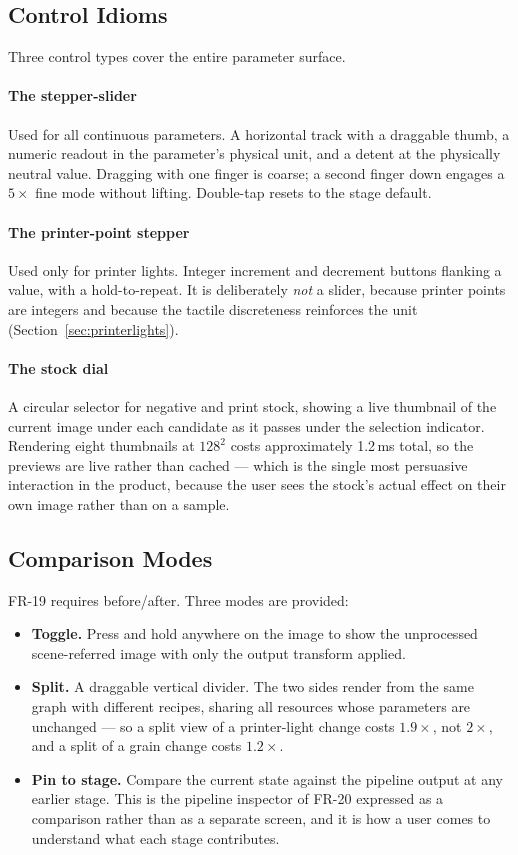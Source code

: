 \subsection{Control Idioms}

Three control types cover the entire parameter surface.

\paragraph{The stepper-slider} Used for all continuous parameters. A horizontal
track with a draggable thumb, a numeric readout in the parameter's physical unit,
and a detent at the physically neutral value. Dragging with one finger is coarse;
a second finger down engages a $5\times$ fine mode without lifting. Double-tap
resets to the stage default.

\paragraph{The printer-point stepper} Used only for printer lights. Integer
increment and decrement buttons flanking a value, with a hold-to-repeat. It is
deliberately \emph{not} a slider, because printer points are integers and
because the tactile discreteness reinforces the unit
(Section~\ref{sec:printerlights}).

\paragraph{The stock dial} A circular selector for negative and print stock,
showing a live thumbnail of the current image under each candidate as it passes
under the selection indicator. Rendering eight thumbnails at $128^2$ costs
approximately 1.2\,ms total, so the previews are live rather than cached ---
which is the single most persuasive interaction in the product, because the user
sees the stock's actual effect on their own image rather than on a sample.

\subsection{Comparison Modes}

FR-19 requires before/after. Three modes are provided:

\begin{itemize}
\item \textbf{Toggle.} Press and hold anywhere on the image to show the
unprocessed scene-referred image with only the output transform applied.
\item \textbf{Split.} A draggable vertical divider. The two sides render from
the same graph with different recipes, sharing all resources whose parameters
are unchanged --- so a split view of a printer-light change costs
$1.9\times$, not $2\times$, and a split of a grain change costs $1.2\times$.
\item \textbf{Pin to stage.} Compare the current state against the pipeline
output at any earlier stage. This is the pipeline inspector of FR-20 expressed
as a comparison rather than as a separate screen, and it is how a user comes to
understand what each stage contributes.
\end{itemize}

